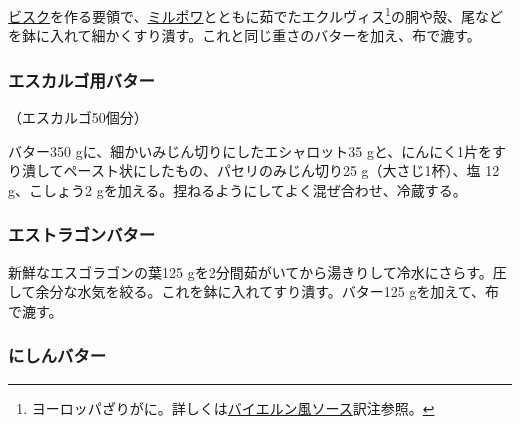\begin{recette}
\protect\hyperlink{}{ビスク}を作る要領で、\protect\hyperlink{mirepoix}{ミルポワ}とともに茹でたエクルヴィス\footnote{ヨーロッパざりがに。詳しくは\protect\hyperlink{sauce-bavaroise}{バイエルン風ソース}訳注参照。}の胴や殻、尾などを鉢に入れて細かくすり潰す。これと同じ重さのバターを加え、布で漉す。

\hypertarget{beurre-pour-les-escargots}{%
\subsubsection{エスカルゴ用バター}\label{beurre-pour-les-escargots}}



（エスカルゴ50個分）

バター350 gに、細かいみじん切りにしたエシャロット35
gと、にんにく1片をすり潰してペースト状にしたもの、パセリのみじん切り25
g（大さじ1杯）、塩 12 g、こしょう2
gを加える。捏ねるようにしてよく混ぜ合わせ、冷蔵する。

\hypertarget{beurre-d-estragon}{%
\subsubsection{エストラゴンバター}\label{beurre-d-estragon}}



新鮮なエスゴラゴンの葉125
gを2分間茹がいてから湯きりして冷水にさらす。圧して余分な水気を絞る。これを鉢に入れてすり潰す。バター125
gを加えて、布で漉す。

\hypertarget{beurre-de-hereng}{%
\subsubsection{にしんバター}\label{beurre-de-hereng}}




\end{recette}
